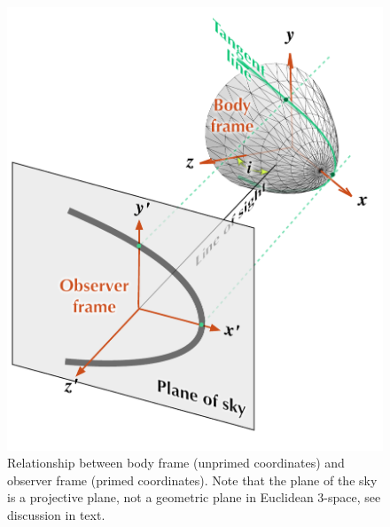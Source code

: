 \begin{figure}
  \centering
  \includegraphics[width=\linewidth]{figs/projection-pos}
  \caption{Relationship between body frame (unprimed coordinates) and
    observer frame (primed coordinates).  Note that the plane of the
    sky is a projective plane, not a geometric plane in Euclidean
    3-space, see discussion in text.}
  \label{fig:projection-pos}
\end{figure}




